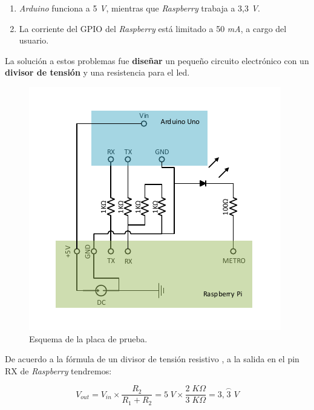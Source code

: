 \begin{enumerate}
	\item \textit{Arduino} funciona a 5 \textit{V}, mientras que \textit{Raspberry} trabaja a 3,3 \textit{V}.
	\item La corriente del \acrshort{GPIO} del \textit{Raspberry} está limitado a 50 \textit{mA}, a cargo del usuario.
\end{enumerate}

La solución a estos problemas fue \textbf{diseñar} un pequeño circuito electrónico con un \textbf{divisor de tensión} y una resistencia para el \acrshort{led}.

\smallskip

\begin{figure}[H]
	\noindent \begin{centering}
		\includegraphics[width=\linewidth/2]{capitulo6/proto_esquema}
		\par\end{centering}
	\smallskip
	\caption{\label{fig:proto_esquema} Esquema de la placa de prueba.}
\end{figure} 

\smallskip

De acuerdo a la fórmula de un divisor de tensión resistivo \cite{wiki_divtension}, a la salida en el pin RX de \textit{Raspberry} tendremos:


\begin{equation}
	V_{out} = V_{in} \times \frac{R_2}{R_1 + R_2} = 5 \; V \times \frac{2 \; K\Omega}{3 \; K\Omega} = 3,\stackrel{\frown}{3} \; V
\end{equation}


